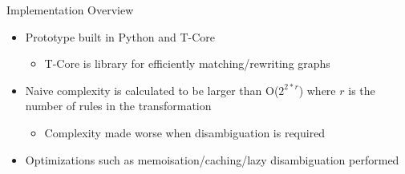 \documentclass[xcolor=dvipsnames, 14pt]{beamer}
\begin{document}
\begin{frame}{Implementation Overview}
\begin{itemize}
\item Prototype built in Python and T-Core
\begin{itemize}
\item T-Core is library for efficiently matching/rewriting graphs
\end{itemize}
\item Naive complexity is calculated to be larger than O($2^{2*r}$) where $r$ is the number of rules in the transformation
\begin{itemize}
\item Complexity made worse when disambiguation is required
\end{itemize}
\item Optimizations such as memoisation/caching/lazy disambiguation performed
\end{itemize}
\end{frame}
\end{document}
